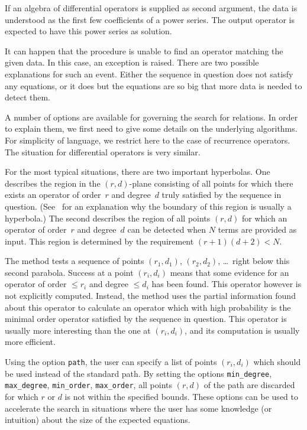 \documentclass{amsart}
\begin{document}
If an algebra of differential operators is supplied as second argument, the data
is understood as the first few coefficients of a power series. The output
operator is expected to have this power series as solution.

It can happen that the procedure is unable to find an operator matching the 
given data. In this case, an exception is raised. There are two possible 
explanations for such an event. Either the sequence in question does not 
satisfy any equations, or it does but the equations are so big that more
data is needed to detect them. 

A number of options are available for governing the search for relations.  In
order to explain them, we first need to give some details on the underlying
algorithms. For simplicity of language, we restrict here to the case of
recurrence operators. The situation for differential operators is very similar.

For the most typical situations, there are two important hyperbolas. One
describes the region in the $(r,d)$-plane consisting of all points for which
there exists an operator of order~$r$ and degree~$d$ truly satisfied by the
sequence in question. (See~\cite{..} for an explanation why the boundary of this
region is usually a hyperbola.) The second describes the region of all points
$(r,d)$ for which an operator of order~$r$ and degree~$d$ can be detected when
$N$ terms are provided as input. This region is determined by the requirement
$(r+1)(d+2)<N$. 

The method tests a sequence of points $(r_1,d_1)$, $(r_2,d_2)$, \dots\ right
below this second parabola. Success at a point $(r_i,d_i)$ means that some
evidence for an operator of order $\leq r_i$ and degree $\leq d_i$ has been found. 
This operator however is not explicitly computed. Instead, the method uses the
partial information found about this operator to calculate an operator which with 
high probability is the minimal order operator satisfied by the sequence in question. 
This operator is usually more interesting than the one at $(r_i,d_i)$, and its 
computation is usually more efficient. 

Using the option \verb|path|, the user can specify a list of points $(r_i,d_i)$
which should be used instead of the standard path. By setting the options \verb|min_degree|,
\verb|max_degree|, \verb|min_order|, \verb|max_order|, all points $(r,d)$ of the path
are discarded for which $r$ or $d$ is not within the specified bounds. These options
can be used to accelerate the search in situations where the user has some knowledge
(or intuition) about the size of the expected equations. 
\end{document}

